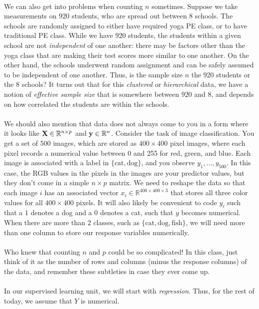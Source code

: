 \documentclass[titlepage,10pt]{scrartcl}
\begin{document}
\\
We can also get into problems when counting $n$ sometimes. Suppose we take measurements on $920$ students, who are spread out between $8$ schools. The schools are randomly assigned to either have required yoga PE class, or to have traditional PE class.  While we have $920$ students, the students within a given school are not \emph{independent} of one another: there may be factors other than the yoga class that are making their test scores more similar to one another. On the other hand, the schools underwent random assignment and can be safely assumed to be independent of one another. Thus, is the sample size $n$ the $920$ students or the $8$ schools? It turns out that for this \emph{clustered} or \emph{hierarchical} data, we have a notion of \emph{effective sample size} that is somewhere between $920$ and $8$, and depends on how correlated the students are within the schools. \\
\\
We should also mention that data does not always come to you in a form where it looks like $\bold{X} \in \mathbb{R}^{n \times p}$ and $\bold{y} \in \mathbb{R}^n$. Consider the task of image classification. You get a set of $500$ images, which are stored as $400 \times 400$ pixel images, where each pixel records a numerical value between 0 and 255 for red, green, and blue. Each image is associated with a label in $\{\text{cat},  \text{dog}\}$, and you observe $y_1,\ldots, y_{500}$. In this case, the RGB values in the pixels in the images are your predictor values, but they don't come in a simple $n \times p$ matrix. We need to reshape the data so that each image $i$ has an associated vector $x_i \in \mathbb{R}^{400 \times 400 \times 3}$ that stores all three color values for all $400 \times 400$ pixels. It will also likely be convenient to code $y_i$ such that a $1$ denotes a dog and a $0$ denotes a cat, such that $y$ becomes numerical. When there are more than $2$ classes, such as $\{\text{cat},  \text{dog}, \text{fish}\}$, we will need more than one column to store our response variables numerically.  \\ 
\\
Who knew that counting $n$ and $p$ could be so complicated! In this class, just think of it as the number of rows and columns (minus the response columns) of the data, and remember these subtleties in case they ever come up. \\
\\
In our supervised learning unit, we will start with \emph{regression}. Thus, for the rest of today, we assume that $Y$ is numerical. 
\end{document}
